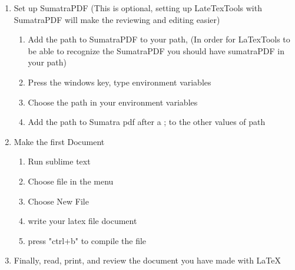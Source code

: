 \documentclass{memoir}
\begin{document}
\begin{enumerate}
  \item Set up SumatraPDF (This is optional, setting up LateTexTools with SumatraPDF will make the reviewing and editing easier)  

  \begin{enumerate}
  \item  Add the path to SumatraPDF to your path, (In order for LaTexTools to be able to recognize the SumatraPDF you should have sumatraPDF in your path)  
    \item Press the windows key, type environment variables
    \item Choose the path in your environment variables
    \item Add the path to Sumatra pdf after a ; to the other values of path
  \end{enumerate}



  \item Make the first Document
  \begin{enumerate}
    \item Run sublime text
    \item Choose file in the menu 
    \item Choose New File
    \item write your latex file document
    \item press "ctrl+b" to compile the file
  \end{enumerate}
  
  \item Finally, read, print, and review the document you have made with \LaTeX

\end{enumerate}
\end{document}
